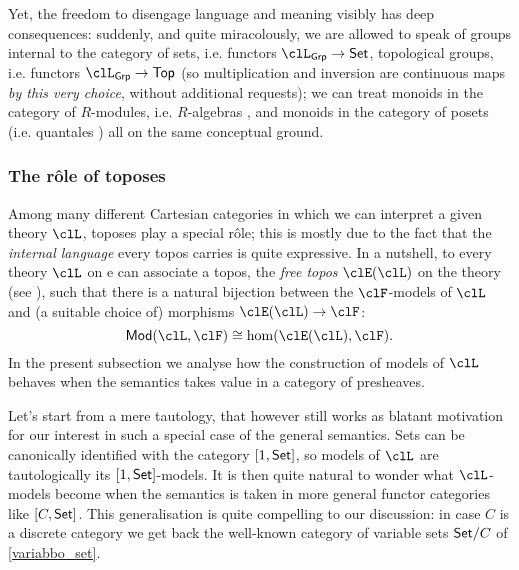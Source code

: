 Yet, the freedom to disengage language and meaning visibly has deep consequences: suddenly, and quite miracolously, we are allowed to speak of groups internal to the category of sets, i.e. functors $\clL_{\cate{Grp}} \to \Set$, topological groups, i.e. functors $\clL_{\cate{Grp}} \to \cate{Top}$ (so multiplication and inversion are continuous maps \emph{by this very choice}, without additional requests); we can treat monoids in the category of $R$-modules, i.e. $R$-algebras \cite[]{}, and monoids in the category of posets \cite{} (i.e. quantales \cite{}) all on the same conceptual ground.

\subsubsection{The r\^ole of toposes}
Among many different Cartesian categories in which we can interpret a given theory $\clL$, toposes play a special r\^ole; this is mostly due to the fact that the \emph{internal language} every topos carries is quite expressive. In a nutshell, to every theory $\clL$ on e can associate a topos, the \emph{free topos} $\clE(\clL)$ on the theory (see \cite{lambek1988introduction}), such that there is a natural bijection between the $\clF$-models of $\clL$ and (a suitable choice of) morphisms $\clE(\clL) \to \clF$:
\[\cate{Mod}(\clL, \clF) \cong \hom(\clE(\clL), \clF).\]
In the present subsection we analyse how the construction of models of $\clL$ behaves when the semantics takes value in a category of presheaves.

Let's start from a mere tautology, that however still works as blatant motivation for our interest in such a special case of the general semantics.  Sets can be canonically identified with the category $[1,\mathsf{Set}]$, so models of $\clL$ are tautologically its $[1,\mathsf{Set}]$-models. It is then quite natural to wonder what $\clL$-models become when the semantics is taken in more general functor categories like $[C,\mathsf{Set}]$. This generalisation is quite compelling to our discussion: in case $C$ is a discrete category we get back the well-known category of variable sets $\mathsf{Set}/C$ of \autoref{variabbo_set}.

